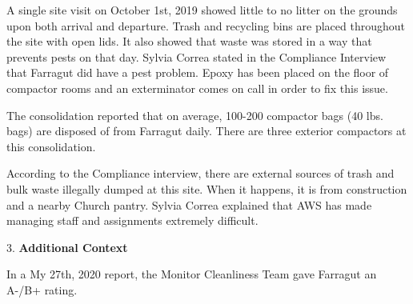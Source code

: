 A single site visit on October 1st, 2019 showed little to no litter on the grounds upon both arrival and departure. Trash and recycling bins are placed throughout the site with open lids. It also showed that waste was stored in a way that prevents pests on that day. Sylvia Correa stated in the Compliance Interview that Farragut did have a pest problem. Epoxy has been placed on the floor of compactor rooms and an exterminator comes on call in order to fix this issue. 

The consolidation reported that on average, 100-200 compactor bags (40 lbs. bags) are disposed of from Farragut daily. There are three exterior compactors at this consolidation.

According to the Compliance interview, there are external sources of trash and bulk waste illegally dumped at this site. When it happens, it is from construction and a nearby Church pantry. Sylvia Correa explained that AWS has made managing staff and assignments extremely difficult.  

3. \textbf{Additional Context}

In a My 27th, 2020 report, the Monitor Cleanliness Team gave Farragut an A-/B+ rating. 